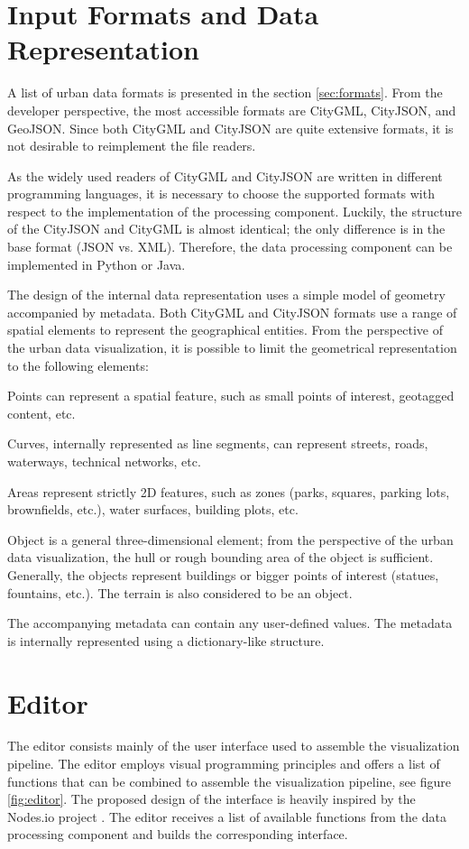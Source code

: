 \section{Input Formats and Data Representation}
\label{sec:inputrepres}
A list of urban data formats is presented in the section \ref{sec:formats}. From the developer perspective, the most accessible formats are CityGML, CityJSON, and GeoJSON. Since both CityGML and CityJSON are quite extensive formats, it is not desirable to reimplement the file readers. 

As the widely used readers of CityGML and CityJSON are written in different programming languages, it is necessary to choose the supported formats with respect to the implementation of the processing component. Luckily, the structure of the CityJSON and CityGML is almost identical; the only difference is in the base format (JSON vs. XML). Therefore, the data processing component can be implemented in Python or Java. 

The design of the internal data representation uses a simple model of geometry accompanied by metadata. Both CityGML and CityJSON formats use a range of spatial elements to represent the geographical entities. From the perspective of the urban data visualization, it is possible to limit the geometrical representation to the following elements:
\begin{description}[noitemsep]
    \item[Points] Points can represent a spatial feature, such as small points of interest, geotagged content, etc.
    \item[Curves] Curves, internally represented as line segments, can represent streets, roads, waterways, technical networks, etc.
    \item[Areas] Areas represent strictly 2D features, such as zones (parks, squares, parking lots, brownfields, etc.), water surfaces, building plots, etc.
    \item[Objects] Object is a general three-dimensional element; from the perspective of the urban data visualization, the hull or rough bounding area of the object is sufficient. Generally, the objects represent buildings or bigger points of interest (statues, fountains, etc.). The terrain is also considered to be an object.
\end{description}
The accompanying metadata can contain any user-defined values. The metadata is internally represented using a dictionary-like structure. 

\section{Editor}
The editor consists mainly of the user interface used to assemble the visualization pipeline. The editor employs visual programming principles and offers a list of functions that can be combined to assemble the visualization pipeline, see figure \ref{fig:editor}. The proposed design of the interface is heavily inspired by the Nodes.io project \cite{nodesio}. The editor receives a list of available functions from the data processing component and builds the corresponding interface. 

